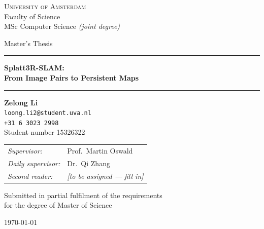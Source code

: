 \begin{titlepage}
\thispagestyle{empty}
\centering
\singlespacing

\vspace*{0.4cm}

{\Large\scshape University of Amsterdam}\\[0.25cm]
{\large Faculty of Science}\\[0.12cm]
{\large MSc Computer Science \emph{(joint degree)}}

\vspace{1.4cm}

{\large Master's Thesis}

\vspace{0.9cm}

\rule{\linewidth}{0.5pt}

\vspace{0.5cm}

{\LARGE\bfseries Splatt3R-SLAM:\\[0.2cm]
From Image Pairs to Persistent Maps\par}

\vspace{0.5cm}

\rule{\linewidth}{0.5pt}

\vspace{1.4cm}

{\large\bfseries Zelong Li}\\[0.2cm]
{\normalsize \texttt{loong.li2@student.uva.nl}}\\[0.1cm]
{\normalsize \texttt{+31\,6\,3023\,2998}}\\[0.1cm]
{\normalsize Student number 15326322}

\vspace{1.4cm}

\begin{tabular}{@{}ll@{}}
\emph{Supervisor:}       & Prof.\ Martin Oswald\\[0.15cm]
\emph{Daily supervisor:} & Dr.\ Qi Zhang\\[0.15cm]
\emph{Second reader:}    & \emph{[to be assigned --- fill in]}\\
\end{tabular}

\vfill

{\normalsize Submitted in partial fulfilment of the requirements\\
for the degree of Master of Science}

\vspace{0.8cm}

{\normalsize \today}

\vspace{0.4cm}
\end{titlepage}
